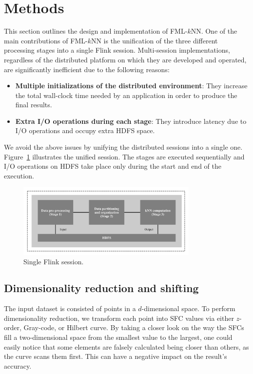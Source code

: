 
\section{Methods} 
\label{sec:knn_methods}

\graphicspath{{Papers/SpringerJournalOfBigData/}}

This section outlines the design and implementation of FML-$k$NN. One of the main contributions of FML-$k$NN is the unification of the three different processing stages into a single Flink session. Multi-session implementations, regardless of the distributed platform on which they are developed and operated, are significantly inefficient due to the following reasons:

\begin{itemize}
	\item \textbf{Multiple initializations of the distributed environment}: They increase the total wall-clock time needed by an application in order to produce the final results.
	\item \textbf{Extra I/O operations during each stage}: They introduce latency due to I/O operations and occupy extra HDFS space.
\end{itemize}

We avoid the above issues by unifying the distributed sessions into a single one. Figure~\ref{figure2} illustrates the unified session. The stages are executed sequentially and I/O operations on HDFS take place only during the start and end of the execution.

\begin{figure}[!tb]
	\centering
	\includegraphics[width=0.8\textwidth]{figures/figure2.png}
	\caption{Single Flink session.}
	\label{figure2}
\end{figure}

\subsection{Dimensionality reduction and shifting}
The input dataset is consisted of points in a $d$-dimensional space. To perform dimensionality reduction, we transform each point into SFC values via either $z$-order, Gray-code, or Hilbert curve. By taking a closer look on the way the SFCs fill a two-dimensional space from the smallest value to the largest, one could easily notice that some elements are falsely calculated being closer than others, as the curve scans them first. This can have a negative impact on the result’s accuracy. 

